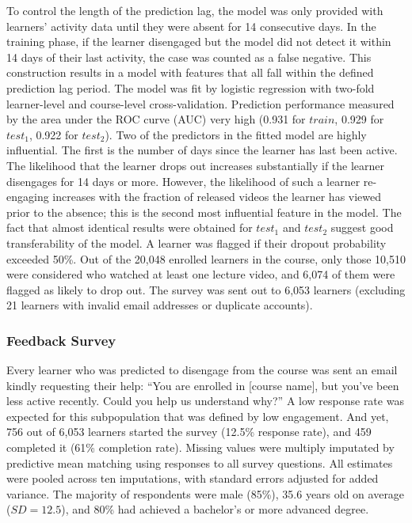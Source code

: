 \documentclass{sigchi}\usepackage[]{graphicx}\usepackage[]{color}
\begin{document}
To control the length of the prediction lag, the model was only provided with learners' activity data until they were absent for 14 consecutive days. In the training phase, if the learner disengaged but the model did not detect it within 14 days of their last activity, the case was counted as a false negative. This construction results in a model with features that all fall within the defined prediction lag period. The model was fit by logistic regression with two-fold learner-level and course-level cross-validation. Prediction performance measured by the area under the ROC curve (AUC) very high (0.931 for $train$, 0.929 for $test_1$, 0.922 for $test_2$). Two of the predictors in the fitted model are highly influential. The first is the number of days since the learner has last been active. The likelihood that the learner drops out increases substantially if the learner disengages for 14 days or more. However, the likelihood of such a learner re-engaging increases with the fraction of released videos the learner has viewed prior to the absence; this is the second most influential feature in the model. The fact that almost identical results were obtained for $test_1$ and $test_2$ suggest good transferability of the model. A learner was flagged if their dropout probability exceeded 50\%. Out of the 20,048 enrolled learners in the course, only those 10,510 were considered who watched at least one lecture video, and 6,074 of them were flagged as likely to drop out. The survey was sent out to 6,053 learners (excluding 21 learners with invalid email addresses or duplicate accounts).


\subsubsection{Feedback Survey}

Every learner who was predicted to disengage from the course was sent an email kindly requesting their help: ``You are enrolled in [course name], but you've been less active recently. Could you help us understand why?'' A low response rate was expected for this subpopulation that was defined by low engagement. And yet, 756 out of 6,053 learners started the survey (12.5\% response rate), and 459 completed it (61\% completion rate). Missing values were multiply imputated by predictive mean matching using responses to all survey questions. All estimates were pooled across ten imputations, with standard errors adjusted for added variance. The majority of respondents were male (85\%), 35.6 years old on average ($SD=12.5$), and 80\% had achieved a bachelor's or more advanced degree.
\end{document}
